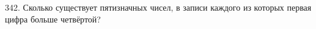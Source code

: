 342. Сколько существует пятизначных чисел, в записи каждого из которых первая цифра больше четвёртой?\\
